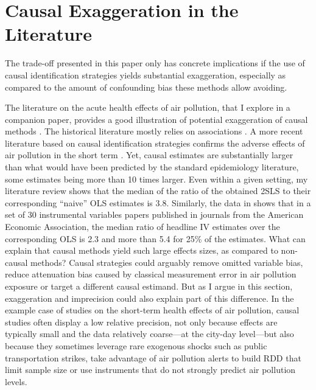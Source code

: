 \documentclass[usletter, 12pt]{article}
\begin{document}
		
	



	\section{Causal Exaggeration in the Literature}\label{lit_review}
	
		The trade-off presented in this paper only has concrete implications if the use of causal identification strategies yields substantial exaggeration, especially as compared to the amount of confounding bias these methods allow avoiding. 
		
		The literature on the acute health effects of air pollution, that I explore in a companion paper, provides a good illustration of potential exaggeration of causal methods \citep{bagilet_accurately_2023}. The historical literature mostly relies on associations \citep{dominici_best_2017, bind_causal_2019}. A more recent literature based on causal identification strategies confirms the adverse effects of air pollution in the short term  \citep{schwartz_estimating_2015, schwartz_national_2018, deryugina_mortality_2019}. Yet, causal estimates are substantially larger than what would have been predicted by the standard epidemiology literature, some estimates being more than 10 times larger. Even within a given setting, my literature review shows that the median of the ratio of the obtained 2SLS to their corresponding ``naive'' OLS estimates is 3.8. Similarly, the data in \cite{youngConsistencyInferenceInstrumental2022} shows that in a set of 30 instrumental variables papers published in journals from the American Economic Association, the median ratio of headline IV estimates over the corresponding OLS is 2.3 and more than 5.4 for 25\% of the estimates. What can explain that causal methods yield such large effects sizes, as compared to non-causal methods? Causal strategies could arguably remove omitted variable bias, reduce attenuation bias caused by classical measurement error in air pollution exposure or target a different causal estimand. But as I argue in this section, exaggeration and imprecision could also explain part of this difference. In the example case of studies on the short-term health effects of air pollution, causal studies often display a low relative precision, not only because effects are typically small and the data relatively coarse---at the city-day level---but also because they sometimes leverage rare exogenous shocks such as public transportation strikes, take advantage of air pollution alerts to build RDD that limit sample size or use instruments that do not strongly predict air pollution levels.
				 
\end{document}
